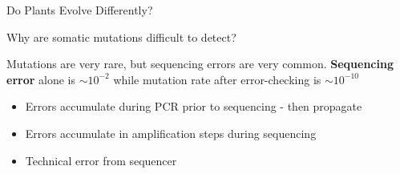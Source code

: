 \documentclass{beamer}
\begin{document}
\begin{frame}{Do Plants Evolve Differently?}




\end{frame}

\begin{frame}{Why are somatic mutations difficult to detect?}

\begin{block}{Mutations are very rare, but sequencing errors are very common.}
\textbf{Sequencing error} alone is \textbf{$\sim10^{-2}$} while mutation rate after error-checking is \textbf{$\sim10^{-10}$}
\end{block}

\begin{itemize}
\item Errors accumulate during PCR prior to sequencing - then propagate
\item Errors accumulate in amplification steps during sequencing
\item Technical error from sequencer
\end{itemize}

\end{frame}
\end{document}
